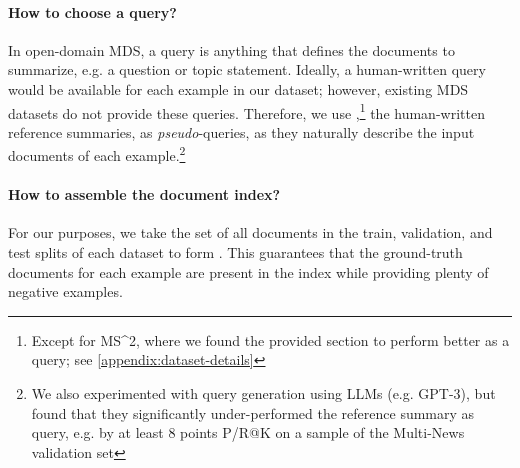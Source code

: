 \documentclass[11pt]{article}
\newcommand\mstoo{{MS\^{}2}\xspace}
\begin{document}
\paragraph{How to choose a query?} In open-domain MDS, a query is anything that defines the documents to summarize, e.g. a question or topic statement. Ideally, a human-written query would be available for each example in our dataset; however, existing MDS datasets do not provide these queries. Therefore, we use ,\footnote{Except for \mstoo, where we found the provided  section to perform better as a query; see \autoref{appendix:dataset-details}} the human-written reference summaries, as \textit{pseudo}-queries, as they naturally describe the input documents of each example.\footnote{We also experimented with query generation using LLMs (e.g. GPT-3), but found that they significantly under-performed the reference summary as query, e.g. by at least 8 points P/R@K on a sample of the Multi-News validation set}

\paragraph{How to assemble the document index?} For our purposes, we take the set of all documents in the train, validation, and test splits of each dataset to form . This guarantees that the ground-truth documents for each example are present in the index while providing plenty of negative examples.
\end{document}
